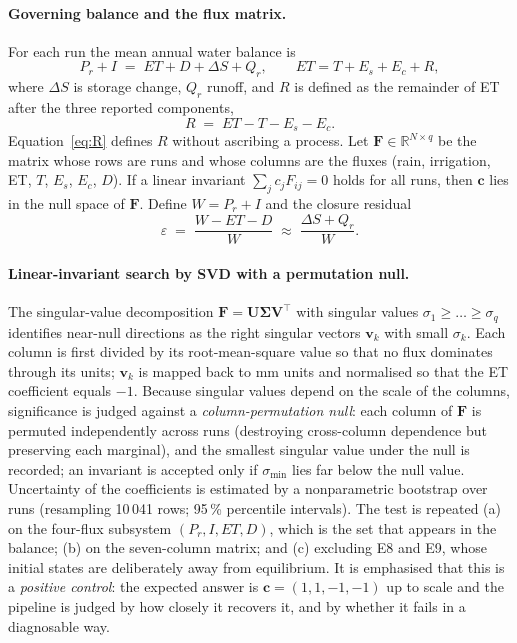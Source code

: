 \documentclass[preprint,12pt,authoryear]{elsarticle}
\begin{document}
\paragraph{Governing balance and the flux matrix.}
For each run the mean annual water balance is
\begin{equation}
P_r+I \;=\; \mathit{ET}+D+\Delta S+Q_r,\qquad \mathit{ET}=T+E_s+E_c+R,
\label{eq:wb2}
\end{equation}
where $\Delta S$ is storage change, $Q_r$ runoff, and $R$ is defined as the remainder of ET after the three reported components,
\begin{equation}
R \;=\; \mathit{ET}-T-E_s-E_c .
\label{eq:R}
\end{equation}
Equation~\eqref{eq:R} defines $R$ without ascribing a process. Let $\mathbf F\in\mathbb R^{N\times q}$ be the matrix whose rows are runs and whose columns are the fluxes (rain, irrigation, ET, $T$, $E_s$, $E_c$, $D$). If a linear invariant $\sum_j c_jF_{ij}=0$ holds for all runs, then $\mathbf c$ lies in the null space of $\mathbf F$. Define $W=P_r+I$ and the closure residual
\begin{equation}
\varepsilon \;=\; \frac{W-\mathit{ET}-D}{W}\;\approx\;\frac{\Delta S+Q_r}{W}.
\label{eq:closure}
\end{equation}

\paragraph{Linear-invariant search by SVD with a permutation null.}
The singular-value decomposition $\mathbf F=\mathbf U\boldsymbol\Sigma\mathbf V^{\top}$ with singular values $\sigma_1\ge\dots\ge\sigma_q$ identifies near-null directions as the right singular vectors $\mathbf v_k$ with small $\sigma_k$. Each column is first divided by its root-mean-square value so that no flux dominates through its units; $\mathbf v_k$ is mapped back to mm units and normalised so that the ET coefficient equals $-1$. Because singular values depend on the scale of the columns, significance is judged against a \emph{column-permutation null}: each column of $\mathbf F$ is permuted independently across runs (destroying cross-column dependence but preserving each marginal), and the smallest singular value under the null is recorded; an invariant is accepted only if $\sigma_{\min}$ lies far below the null value. Uncertainty of the coefficients is estimated by a nonparametric bootstrap over runs (resampling 10\,041 rows; 95\,\% percentile intervals). The test is repeated (a) on the four-flux subsystem $(P_r,I,\mathit{ET},D)$, which is the set that appears in the balance; (b) on the seven-column matrix; and (c) excluding E8 and E9, whose initial states are deliberately away from equilibrium. It is emphasised that this is a \emph{positive control}: the expected answer is $\mathbf c=(1,1,-1,-1)$ up to scale and the pipeline is judged by how closely it recovers it, and by whether it fails in a diagnosable way.
\end{document}
